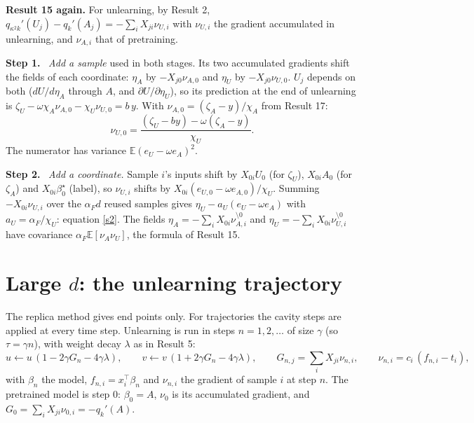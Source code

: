 \documentclass[10pt]{article}
\newcommand{\bs}{\beta^\star}\newcommand{\E}{\mathbb E}\newcommand{\asinh}{\operatorname{arcsinh}}\newcommand{\sk}{\sqrt k}
\newcommand{\step}[1]{\par\smallskip\textbf{Step #1.}\ }
\begin{document}
\textbf{Result 15 again.} For unlearning, by Result 2, $q_{\kappa^2k}'(U_j)-q_k'(A_j)=-\sum_iX_{ji}\nu_{U,i}$ with $\nu_{U,i}$ the gradient accumulated in unlearning, and $\nu_{A,i}$ that of pretraining.
\step1 \emph{Add a sample} used in both stages. Its two accumulated gradients shift the fields of each coordinate: $\eta_A$ by $-X_{j0}\nu_{A,0}$ and $\eta_U$ by $-X_{j0}\nu_{U,0}$. $U_j$ depends on both ($dU/d\eta_A$ through $A$, and $\partial U/\partial\eta_U$), so its prediction at the end of unlearning is $\zeta_U-\omega\chi_A\nu_{A,0}-\chi_U\nu_{U,0}=b\,y$. With $\nu_{A,0}=(\zeta_A-y)/\chi_A$ from Result 17:
\[
\nu_{U,0}=\frac{(\zeta_U-by)-\omega(\zeta_A-y)}{\chi_U}.
\]
The numerator has variance $\E(e_U-\omega e_A)^2$.
\step2 \emph{Add a coordinate.} Sample $i$'s inputs shift by $X_{0i}U_0$ (for $\zeta_U$), $X_{0i}A_0$ (for $\zeta_A$) and $X_{0i}\bs_0$ (label), so $\nu_{U,i}$ shifts by $X_{0i}(e_{U,0}-\omega e_{A,0})/\chi_U$. Summing $-X_{0i}\nu_{U,i}$ over the $\alpha_Fd$ reused samples gives $\eta_U-a_U(e_U-\omega e_A)$ with $a_U=\alpha_F/\chi_U$: equation \eqref{s2}. The fields $\eta_A=-\sum_iX_{0i}\nu_{A,i}^{\setminus0}$ and $\eta_U=-\sum_iX_{0i}\nu_{U,i}^{\setminus0}$ have covariance $\alpha_F\E[\nu_A\nu_U]$, the formula of Result 15.

\section{Large $d$: the unlearning trajectory}
The replica method gives end points only. For trajectories the cavity steps are applied at every time step. Unlearning is run in steps $n=1,2,\dots$ of size $\gamma$ (so $\tau=\gamma n$), with weight decay $\lambda$ as in Result 5:
\[
u\leftarrow u\,(1-2\gamma G_n-4\gamma\lambda),\qquad v\leftarrow v\,(1+2\gamma G_n-4\gamma\lambda),\qquad G_{n,j}=\sum_iX_{ji}\nu_{n,i},\qquad\nu_{n,i}=c_i\,(f_{n,i}-t_i),
\]
with $\beta_n$ the model, $f_{n,i}=x_i^\top\beta_n$ and $\nu_{n,i}$ the gradient of sample $i$ at step $n$. The pretrained model is step $0$: $\beta_0=A$, $\nu_0$ is its accumulated gradient, and $G_0=\sum_iX_{ji}\nu_{0,i}=-q_k'(A)$.
\end{document}
